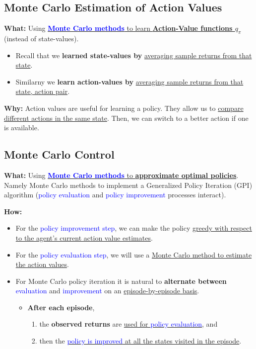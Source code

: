 \documentclass[12pt, a4paper]{article}
\begin{document}
\subsection{Monte Carlo Estimation of Action Values}\label{monte-carlo-estimation-of-action-values}


\textbf{What:} Using \uline{\textbf{\textcolor{blue}{Monte Carlo methods}} to learn \textbf{Action-Value functions $q_\pi$}} (instead of state-values).

\begin{itemize}
  \item Recall that we \textbf{learned state-values by} \uline{averaging sample returns from that state}.
  \item Similarny we \textbf{learn action-values by} \uline{averaging sample returns from that state, action pair}.
\end{itemize}


\textbf{Why:} Action values are useful for learning a policy. They allow us to \uline{compare different actions in the same state}. Then, we can switch to a better action if one is available.







\subsection{Monte Carlo Control}\label{monte-carlo-control}

\textbf{What:} Using \uline{\textbf{\textcolor{blue}{Monte Carlo methods}} to \textbf{approximate optimal policies}}. Namely Monte Carlo methods to implement a Generalized Policy Iteration (GPI) algorithm (\textcolor{blue}{policy evaluation} and \textcolor{blue}{policy improvement} processes interact).

\textbf{How:}

\begin{itemize}
  \item For the \textcolor{blue}{policy improvement step}, we can make the policy \uline{greedy with respect to the agent's current action value estimates}.
  \item For the \textcolor{blue}{policy evaluation step}, we will use a \uline{Monte Carlo method to estimate the action values}.
  \item For Monte Carlo policy iteration it is natural to \textbf{alternate between} \textcolor{blue}{evaluation} and \textcolor{blue}{improvement} on an \uline{episode-by-episode basis}.
  \begin{itemize}
    \item \textbf{After each episode},
    \begin{enumerate}
      \item the \textbf{observed returns} are \uline{used for \textcolor{blue}{policy evaluation}}, and
      \item then the \uline{\textcolor{blue}{policy is improved} at all the states visited in the episode}.
    \end{enumerate}
  \end{itemize}
\end{itemize}
\end{document}
